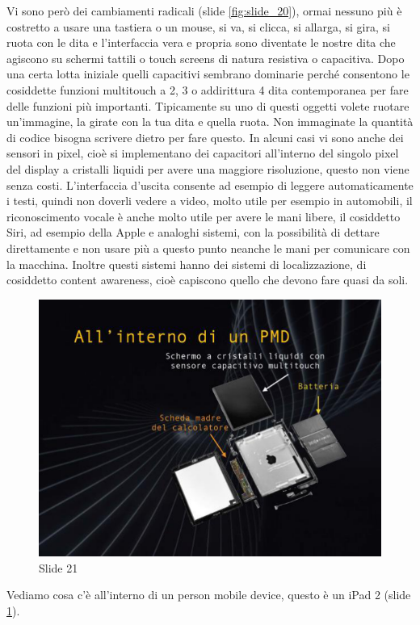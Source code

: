 Vi sono però dei cambiamenti radicali (slide \ref{fig:slide_20}), ormai nessuno più è costretto a usare una tastiera o un mouse, si va, si clicca, si allarga, si gira, si ruota con le dita e l'interfaccia vera e propria sono diventate le nostre dita che agiscono su schermi tattili o touch screens di natura resistiva o capacitiva.
Dopo una certa lotta iniziale quelli capacitivi sembrano dominarie perché consentono le cosiddette funzioni multitouch a 2, 3 o addirittura 4 dita contemporanea per fare delle funzioni più importanti.
Tipicamente su uno di questi oggetti volete ruotare un'immagine, la girate con la tua dita e quella ruota.
Non immaginate la quantità di codice bisogna scrivere dietro per fare questo.
In alcuni casi vi sono anche dei sensori in pixel, cioè si implementano dei capacitori all'interno del singolo pixel del display a cristalli liquidi per avere una maggiore risoluzione, questo non viene senza costi.
L'interfaccia d'uscita consente ad esempio di leggere automaticamente i testi, quindi non doverli vedere a video, molto utile per esempio in automobili, il riconoscimento vocale è anche molto utile per avere le mani libere, il cosiddetto Siri, ad esempio della Apple e analoghi sistemi, con la possibilità di dettare direttamente e non usare più a questo punto neanche le mani per comunicare con la macchina.
Inoltre questi sistemi hanno dei sistemi di localizzazione, di cosiddetto content awareness, cioè capiscono quello che devono fare quasi da soli.


\begin{figure}[ht]
    \centering
    \includegraphics[width=0.8\linewidth]{images/Lez01_p04_fig_04.png}
    \caption{Slide 21}
    \label{fig:slide_21}
\end{figure}

Vediamo cosa c'è all'interno di un person mobile device, questo è un iPad 2 (slide \ref{fig:slide_21}).

